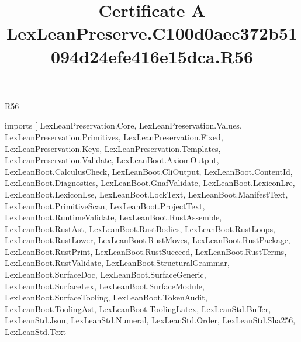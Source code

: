 \begin{lexlean}{R56}
\title{Certificate A LexLeanPreserve.C100d0aec372b51094d24efe416e15dca.R56}
\begin{coremodule}
imports [
  LexLeanPreservation.Core,
  LexLeanPreservation.Values,
  LexLeanPreservation.Primitives,
  LexLeanPreservation.Fixed,
  LexLeanPreservation.Keys,
  LexLeanPreservation.Templates,
  LexLeanPreservation.Validate,
  LexLeanBoot.AxiomOutput,
  LexLeanBoot.CalculusCheck,
  LexLeanBoot.CliOutput,
  LexLeanBoot.ContentId,
  LexLeanBoot.Diagnostics,
  LexLeanBoot.GnafValidate,
  LexLeanBoot.LexiconLre,
  LexLeanBoot.LexiconLse,
  LexLeanBoot.LockText,
  LexLeanBoot.ManifestText,
  LexLeanBoot.PrimitiveScan,
  LexLeanBoot.ProjectText,
  LexLeanBoot.RuntimeValidate,
  LexLeanBoot.RustAssemble,
  LexLeanBoot.RustAst,
  LexLeanBoot.RustBodies,
  LexLeanBoot.RustLoops,
  LexLeanBoot.RustLower,
  LexLeanBoot.RustMoves,
  LexLeanBoot.RustPackage,
  LexLeanBoot.RustPrint,
  LexLeanBoot.RustSucceed,
  LexLeanBoot.RustTerms,
  LexLeanBoot.RustValidate,
  LexLeanBoot.StructuralGrammar,
  LexLeanBoot.SurfaceDoc,
  LexLeanBoot.SurfaceGeneric,
  LexLeanBoot.SurfaceLex,
  LexLeanBoot.SurfaceModule,
  LexLeanBoot.SurfaceTooling,
  LexLeanBoot.TokenAudit,
  LexLeanBoot.ToolingAst,
  LexLeanBoot.ToolingLatex,
  LexLeanStd.Buffer,
  LexLeanStd.Json,
  LexLeanStd.Numeral,
  LexLeanStd.Order,
  LexLeanStd.Sha256,
  LexLeanStd.Text
]


\end{coremodule}
\end{lexlean}
